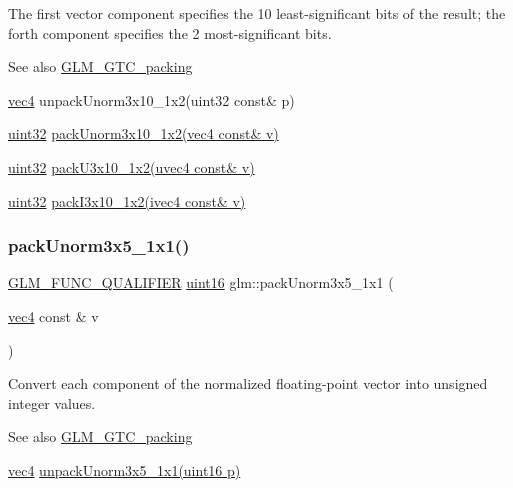 The first vector component specifies the 10 least-\/significant bits of the result; the forth component specifies the 2 most-\/significant bits.

\begin{DoxySeeAlso}{See also}
\hyperlink{group__gtc__packing}{G\+L\+M\+\_\+\+G\+T\+C\+\_\+packing} 

\hyperlink{group__core__types_ga5881b1b022d7fd1b7218f5916532dd02}{vec4} unpack\+Unorm3x10\+\_\+1x2(uint32 const\& p) 

\hyperlink{group__gtc__type__precision_ga202b6a53c105fcb7e531f9b443518451}{uint32} \hyperlink{group__gtc__packing_ga2cf2d11b40bd48639110456fd74c2e33}{pack\+Unorm3x10\+\_\+1x2(vec4 const\& v)} 

\hyperlink{group__gtc__type__precision_ga202b6a53c105fcb7e531f9b443518451}{uint32} \hyperlink{group__gtc__packing_gaf656d8862628f96b20de7a36eaa1fe56}{pack\+U3x10\+\_\+1x2(uvec4 const\& v)} 

\hyperlink{group__gtc__type__precision_ga202b6a53c105fcb7e531f9b443518451}{uint32} \hyperlink{group__gtc__packing_ga032e18fa5bc5b8f3897104aeb2f1e195}{pack\+I3x10\+\_\+1x2(ivec4 const\& v)} 
\end{DoxySeeAlso}
\mbox{\label{group__gtc__packing_ga1b41375846ed66768da78ca299d8d010}} 
\subsubsection{\texorpdfstring{pack\+Unorm3x5\+\_\+1x1()}{packUnorm3x5\_1x1()}}
{\footnotesize\ttfamily \hyperlink{setup_8hpp_a33fdea6f91c5f834105f7415e2a64407}{G\+L\+M\+\_\+\+F\+U\+N\+C\+\_\+\+Q\+U\+A\+L\+I\+F\+I\+ER} \hyperlink{group__gtc__type__precision_gad8c2939e1fdd8e5828b31d95c52255d5}{uint16} glm\+::pack\+Unorm3x5\+\_\+1x1 (\begin{DoxyParamCaption}\item[{\hyperlink{group__core__types_ga5881b1b022d7fd1b7218f5916532dd02}{vec4} const \&}]{v }\end{DoxyParamCaption})}

Convert each component of the normalized floating-\/point vector into unsigned integer values.

\begin{DoxySeeAlso}{See also}
\hyperlink{group__gtc__packing}{G\+L\+M\+\_\+\+G\+T\+C\+\_\+packing} 

\hyperlink{group__core__types_ga5881b1b022d7fd1b7218f5916532dd02}{vec4} \hyperlink{group__gtc__packing_gaab3b476e8f320670717fd518f350ce28}{unpack\+Unorm3x5\+\_\+1x1(uint16 p)} 
\end{DoxySeeAlso}
\mbox{\label{group__gtc__packing_gac561f06c908b7302537a8ef29fcb409e}} 
